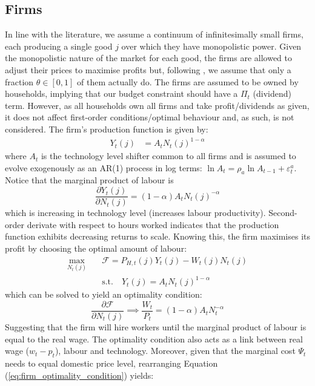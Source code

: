 \subsection{Firms}
In line with the literature, we assume a continuum of infinitesimally small firms, each producing a single good $j$ over which they have monopolistic power. Given the monopolistic nature of the market for each good, the firms are allowed to adjust their prices to maximise profits but, following \textcite{calvo_1983_staggered}, we assume that only a fraction $\theta \in [0,1]$ of them actually do. The firms are assumed to be owned by households, implying that our budget constraint should have a $\Pi_t$ (dividend) term. However, as all households own all firms and take profit/dividends as given, it does not affect first-order conditions/optimal behaviour and, as such, is not considered. The firm's production function is given by: 
\begin{align}
 Y_t(j) & = A_t {N_t(j)}^{1-\alpha} 
\end{align}
where $A_t$ is the technology level shifter common to all firms and is assumed to evolve exogenously as an AR(1) process in log terms: $\ln A_t = \rho_a \ln A_{t-1} + \varepsilon^a_t$. Notice that the marginal product of labour is
\begin{equation}
 \frac{\partial Y_t(j)}{\partial N_t(j)} = (1-\alpha)A_t {N_t(j)}^{-\alpha}
\end{equation}
which is increasing in technology level (increases labour productivity). Second-order derivate with respect to hours worked indicates that the production function exhibits decreasing returns to scale. Knowing this, the firm maximises its profit by choosing the optimal amount of labour:
\begin{align}
 \max_{N_t(j)} \quad & \mathcal{F} = P_{H,t}(j)Y_{t}(j) - W_t(j)N_{t}(j) \\
 & \text{s.t.} \quad Y_t(j) = A_t {N_t(j)}^{1-\alpha} 
\end{align}
which can be solved to yield an optimality condition:
\begin{equation}
 \frac{\partial \mathcal{F}}{\partial N_t(j)} \implies \frac{W_t}{P_t} = (1-\alpha)A_t N_t^{-\alpha} \label{eq:firm_optimality_condition}
\end{equation}
Suggesting that the firm will hire workers until the marginal product of labour is equal to the real wage. The optimality condition also acts as a link between real wage ($w_t - p_t$), labour and technology. Moreover, given that the marginal cost $\Psi_t$ needs to equal domestic price level, rearranging Equation (\ref{eq:firm_optimality_condition}) yields: 
